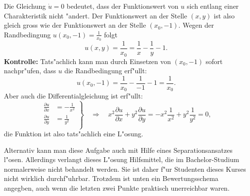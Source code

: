 {\begin{loesung}
Die Gleichung $\dot u=0$ bedeutet, dass der Funktionswert von $u$ sich
entlang einer Charakteristik nicht "andert.
Der Funktionswert an der Stelle $(x,y)$ ist
also gleich gross wie der Funktionswert an der Stelle $(x_0,-1)$. Wegen der
Randbedingung $u(x_0,-1)=\frac1{x_0}$ folgt
\[
u(x,y)=\frac1{x_0}=\frac1x-\frac1y-1.
\]
{\bf Kontrolle:}
Tats"achlich kann man durch Einsetzen von $(x_0,-1)$ sofort nachpr"ufen,
dass $u$ die Randbedingung erf"ullt:
\[
u(x_0,-1)=\frac1{x_0}-\frac1{-1}-1=\frac1{x_0}.
\]
Aber auch die Differentialgleichung ist erf"ullt:
\[
\left.
\begin{aligned}
\frac{\partial u}{\partial x}&=-\frac1{x^2}\\
\frac{\partial u}{\partial y}&=\frac1{y^2}\\
\end{aligned}
\right\}
\quad\Rightarrow\quad
x^2\frac{\partial u}{\partial x}+y^2\frac{\partial u}{\partial y}
=
-x^2\frac1{x^2}+y^2\frac1{y^2}
=
0,
\]
die Funktion ist also tats"achlich eine L"osung.

\medskip

Alternativ kann man diese Aufgabe auch mit Hilfe eines Separationsansatzes
l"osen. Allerdings verlangt dieses L"osung Hilfsmittel, die im Bachelor-Studium
normalerweise nicht behandelt werden. Sie ist daher f"ur Studenten dieses
Kurses nicht wirklich durchf"uhrbar. Trotzdem ist unten ein Bewertungsschema
angegben, auch wenn die letzten zwei Punkte praktisch unerreichbar waren.

\medskip


\end{loesung}}
